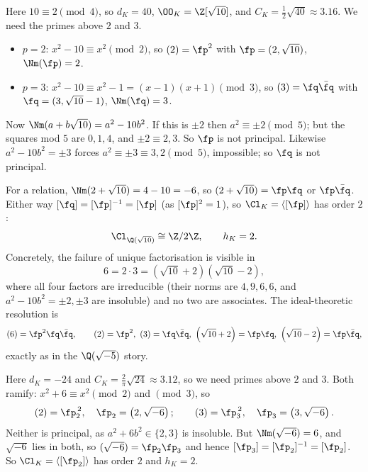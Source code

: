 \begin{example}[$K = \Q(\sqrt{10})$]\label{ex:cl10}
	Here $10 \equiv 2\pmod4$, so $d_K = 40$, $\OO_K = \Z[\sqrt{10}]$, and $C_K = \tfrac12\sqrt{40}\approx3.16$. We need the primes above $2$ and $3$.
	\begin{itemize}
		\item $p=2$: $x^2-10\equiv x^2\pmod2$, so $(2) = \fp^2$ with $\fp = (2,\sqrt{10})$, $\Nm(\fp)=2$.
		\item $p=3$: $x^2-10\equiv x^2-1 = (x-1)(x+1)\pmod 3$, so $(3) = \fq\bar\fq$ with $\fq = (3,\sqrt{10}-1)$, $\Nm(\fq)=3$.
	\end{itemize}
	Now $\Nm(a+b\sqrt{10}) = a^2-10b^2$. If this is $\pm2$ then $a^2\equiv\pm2\pmod 5$; but the squares mod $5$ are $0,1,4$, and $\pm2 \equiv 2, 3$. So $\fp$ is not principal. Likewise $a^2-10b^2 = \pm3$ forces $a^2 \equiv \pm3 \equiv 3, 2 \pmod 5$, impossible; so $\fq$ is not principal.

	For a relation, $\Nm(2+\sqrt{10}) = 4-10 = -6$, so $(2+\sqrt{10}) = \fp\fq$ or $\fp\bar\fq$. Either way $[\fq] = [\fp]^{-1} = [\fp]$ (as $[\fp]^2 = 1$), so $\Cl_K = \langle[\fp]\rangle$ has order $2$:
	$$\Cl_{\Q(\sqrt{10})}\cong\Z/2\Z, \qquad h_K = 2.$$
	Concretely, the failure of unique factorisation is visible in
	$$6 = 2\cdot 3 = \left(\sqrt{10}+2\right)\left(\sqrt{10}-2\right),$$
	where all four factors are irreducible (their norms are $4, 9, 6, 6$, and $a^2-10b^2 = \pm2,\pm3$ are insoluble) and no two are associates. The ideal-theoretic resolution is
	$$(6) = \fp^2\fq\bar\fq, \qquad (2) = \fp^2,\ (3) = \fq\bar\fq,\ \left(\sqrt{10}+2\right) = \fp\fq,\ \left(\sqrt{10}-2\right) = \fp\bar\fq,$$
	exactly as in the $\Q(\sqrt{-5})$ story.
\end{example}

\begin{example}[$K = \Q(\sqrt{-6})$]
	Here $d_K = -24$ and $C_K = \tfrac2\pi\sqrt{24}\approx3.12$, so we need primes above $2$ and $3$. Both ramify: $x^2+6 \equiv x^2 \pmod 2$ and $\pmod 3$, so
	$$(2) = \fp_2^{\,2}, \quad \fp_2 = \left(2,\sqrt{-6}\right); \qquad (3) = \fp_3^{\,2}, \quad \fp_3 = \left(3,\sqrt{-6}\right).$$
	Neither is principal, as $a^2+6b^2 \in \{2,3\}$ is insoluble. But $\Nm(\sqrt{-6}) = 6$, and $\sqrt{-6}$ lies in both, so $(\sqrt{-6}) = \fp_2\fp_3$ and hence $[\fp_3] = [\fp_2]^{-1} = [\fp_2]$. So $\Cl_K = \langle[\fp_2]\rangle$ has order $2$ and $h_K = 2$.
\end{example}

